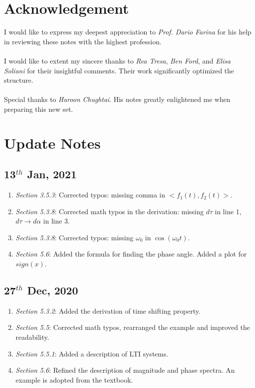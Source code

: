 \documentclass[12pt,a4paper]{article}
\begin{document}
\newpage
\section*{Acknowledgement}
I would like to express my deepest appreciation to \emph{Prof. Dario Farina} for his help in reviewing these notes with the highest profession.
\ \\ \\
I would like to extent my sincere thanks to \emph{Rea Tresa}, \emph{Ben Ford}, and \emph{Elisa Soliani} for their insightful comments. Their work significantly optimized the structure. 
\ \\ \\
Special thanks to \emph{Haroon Chughtai}. His notes greatly enlightened me when preparing this new set.

\vspace{1cm}
\section*{Update Notes}
\subsection*{13$^{th}$ Jan, 2021}
\begin{enumerate}
\item  \emph{Section 3.5.3}: Corrected typos: missing comma in $<f_{1}(t), f_{2}(t)>$.
\item \emph{Section 5.3.8}: Corrected math typos in the derivation: missing $d\tau$ in line 1, $d\tau \to d\alpha$ in line 3.
\item \emph{Section 5.3.8}: Corrected typos: missing $\omega_{0}$ in $\cos(\omega_{0} t)$.
\item \emph{Section 5.6}: Added the formula for finding the phase angle. Added a plot for $sign(x)$.
\end{enumerate}
\subsection*{27$^{th}$ Dec, 2020}
\begin{enumerate}
\item \emph{Section 5.3.2}: Added the derivation of time shifting property.
\item \emph{Section 5.5}: Corrected math typos, rearranged the example and improved the readability.
\item \emph{Section 5.5.1}: Added a description of LTI systems.
\item \emph{Section 5.6}: Refined the description of magnitude and phase spectra. An example is adopted from the textbook.
\end{enumerate}
\end{document}
